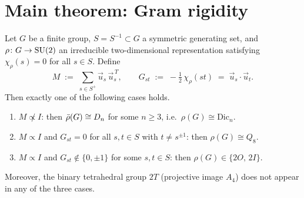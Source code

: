 \section{Main theorem: Gram rigidity}
  \label{sec:theorem}

  \begin{theorem}
    \label{thm:gram-rigidity}
    Let $G$ be a finite group, $S = S^{-1} \subset G$ a symmetric generating set, and
    $\rho\colon G \to \mathrm{SU}(2)$ an irreducible two-dimensional representation satisfying
    $\chi_\rho(s) = 0$ for all $s \in S$.
    Define
    \[
      M \;:=\; \sum_{s \in S^+} \vec{u}_s\,\vec{u}_s^{\,T},
      \qquad
      G_{st} \;:=\; -\tfrac{1}{2}\,\chi_\rho(st) \;=\; \vec{u}_s \cdot \vec{u}_t.
    \]
    Then exactly one of the following cases holds.
    \begin{enumerate}
      \item[\emph{(i)}] $M \not\propto I$:
      then $\bar{\rho}(G) \cong D_n$ for some $n \ge 3$, i.e.\ $\rho(G) \cong \mathrm{Dic}_n$.

      \item[\emph{(ii)}] $M \propto I$ and $G_{st} = 0$ for all $s, t \in S$
      with $t \neq s^{\pm 1}$:
      then $\rho(G) \cong Q_8$.

      \item[\emph{(iii)}] $M \propto I$ and $G_{st} \notin \{0, \pm 1\}$ for some
      $s, t \in S$:
      then $\rho(G) \in \{2O,\, 2I\}$.
    \end{enumerate}
    Moreover, the binary tetrahedral group $2T$ (projective image $A_4$)
    does not appear in any of the three cases.
  \end{theorem}

